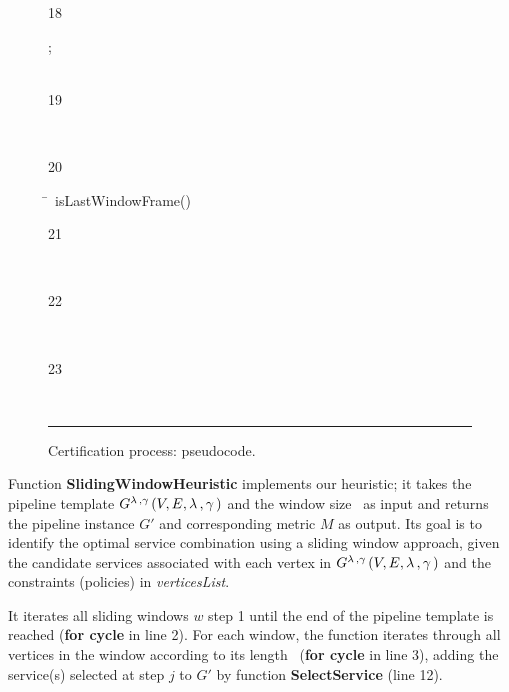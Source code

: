 \begin{figure}[!t]
\begin{tabbing}
                    \begin{redtext}18\end{redtext};\\
                    \\
                    \begin{redtext}19\end{redtext}\\
                    \begin{redtext}20\end{redtext}\=~isLastWindowFrame()\\
                    \begin{redtext}21\end{redtext}\tabone{} \bestcombination\\
                    \begin{redtext}22\end{redtext}\\
                    \begin{redtext}23\end{redtext}\tabone{} \bestcombination[0]\\



                \end{tabbing}
        \hrule
        \vspace{10pt}
        \caption{\label{fig:slidingwindow-pseudocode} Certification process: pseudocode.}
\end{figure}


Function \textbf{SlidingWindowHeuristic} implements our heuristic; it takes the pipeline template $G^{\lambda\,,\gamma\,}(V,E,\lambda\,,\gamma\,)$ and the window size \windowsize\ as input and returns the pipeline instance $G'$ and corresponding metric $M$ as output. Its goal is to identify the optimal service combination using a sliding window approach, given the candidate services associated with each vertex in $G^{\lambda\,,\gamma\,}(V,E,\lambda\,,\gamma\,)$ and the constraints (policies) in \emph{verticesList}.

It iterates all sliding windows $w$ step 1 until the end of the pipeline template is reached (\textbf{for cycle} in line 2). For each window, the function iterates through all vertices in the window according to its length \windowsize\ (\textbf{for cycle} in line 3), adding the service(s) selected at step $j$ to $G'$ by function \textbf{SelectService} (line 12).

